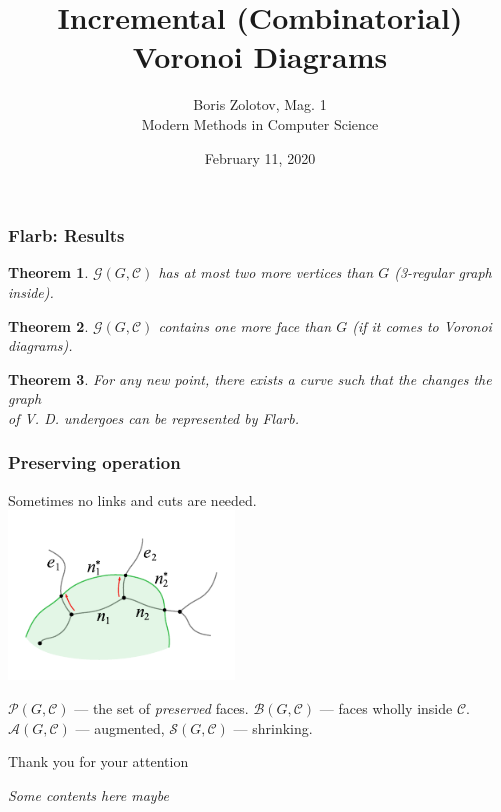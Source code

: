\documentclass[aspectratio=169,12pt,notheorems]{beamer}
\title[Incremental Voronoi Diagrams]
	{\bfseries Incremental (Combinatorial)
	     Voronoi Diagrams}
\author[\ ]
	{Boris Zolotov, Mag. 1 \\ \vspace{0.3cm}
		{\small Modern Methods in Computer Science}}
\institute[\ ]{\ }
\date{February 11, 2020}
\theoremstyle{plain}
\newtheorem{theorem}{Theorem}
\theoremstyle{definition}
\def\ps{\\ [0.65cm]} \linespread{1.16}
\begin{document}
\def\mC{\mathcal C} \def\mF{\mathcal F}
\def\mE{\mathcal E} \def\mG{\mathcal G}

\frame{\titlepage}



\begin{frame} \frametitle{Flarb: Results}
\begin{theorem}
	$\mG(G, \mC)$ has at most two more vertices than $G$ (3-regular graph inside).
\end{theorem} \medskip
\begin{theorem}
	$\mG(G, \mC)$ contains one more face than $G$ (if it comes to Voronoi diagrams).
\end{theorem} \medskip
\begin{theorem}
	For any new point, there exists a curve such that the changes the graph \\
	of V. D. undergoes can be represented by Flarb.
\end{theorem}
\end{frame}

\begin{frame} \frametitle{Preserving operation}
\begin{center}
	Sometimes no links and cuts are needed. \\ \vspace{-0.15cm}
	\includegraphics[width=6cm]{flarb/4cost-free}
\end{center} \vspace{-0.6cm}

$\mathcal P(G,\mC)$ — the set of {\it preserved} faces. $\mathcal B(G,\mC)$ — faces wholly inside $\mC$. \\
$\mathcal A(G,\mC)$ — augmented, $\mathcal S(G,\mC)$ — shrinking.
\end{frame}

\begin{frame} \begin{center}
	{\Huge Thank you for your attention} \ps
\end{center}
	{\it Some contents here maybe}
\end{frame}
\end{document}

